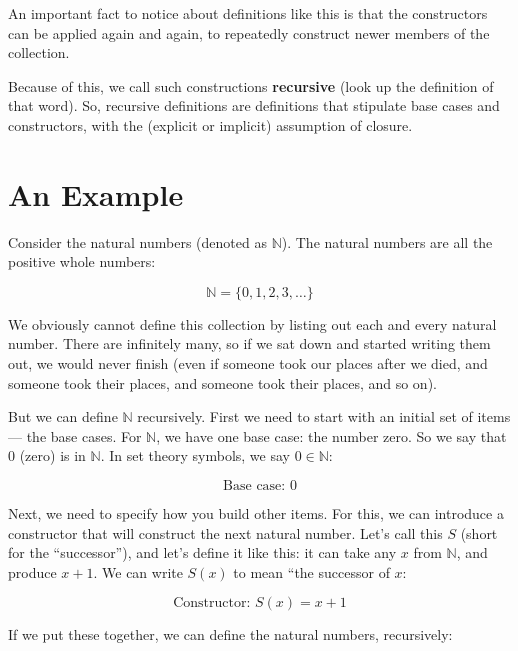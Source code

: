 \documentclass{book}
\numberwithin{equation}{chapter}
\newcommand{\vocab}{\textbf}
\begin{document}
\noindent
An important fact to notice about definitions like this is that the constructors can be applied again and again, to repeatedly construct newer members of the collection.

Because of this, we call such constructions \vocab{recursive} (look up the definition of that word). So, recursive definitions are definitions that stipulate base cases and constructors, with the (explicit or implicit) assumption of closure. 


\section{An Example}

Consider the natural numbers (denoted as $\mathbb{N}$). The natural numbers are all the positive whole numbers:

\begin{equation}
\mathbb{N} = \{ 0, 1, 2, 3, \ldots \}
\end{equation}

\noindent
We obviously cannot define this collection by listing out each and every natural number. There are infinitely many, so if we sat down and started writing them out, we would never finish (even if someone took our places after we died, and someone took their places, and someone took their places, and so on).

But we can define $\mathbb{N}$ recursively. First we need to start with an initial set of items --- the base cases. For $\mathbb{N}$, we have one base case: the number zero. So we say that 0 (zero) is in $\mathbb{N}$. In set theory symbols, we say $0 \in \mathbb{N}$:

\begin{equation*}
\text{Base case: } 0
\end{equation*}

\noindent
Next, we need to specify how you build other items. For this, we can introduce a constructor that will construct the next natural number. Let's call this $S$ (short for the ``successor''), and let's define it like this: it can take any $x$ from $\mathbb{N}$, and produce $x + 1$. We can write $S(x)$ to mean ``the successor of $x$:

\begin{equation*}
\text{Constructor: } S(x) = x + 1
\end{equation*}

\noindent
If we put these together, we can define the natural numbers, recursively:
\end{document}
